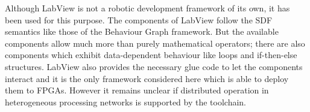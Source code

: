 \documentclass[a4paper,twocolumn]{esapub2005} %
\begin{document}
Although LabView is not a robotic development framework of its own, it has been used for this purpose.
The components of LabView follow the SDF semantics like those of the Behaviour Graph framework.
But the available components allow much more than purely mathematical operators; there are also components which exhibit data-dependent behaviour like loops and if-then-else structures.
LabView also provides the necessary glue code to let the components interact and it is the only framework considered here which is able to deploy them to FPGAs.
However it remains unclear if distributed operation in heterogeneous processing networks is supported by the toolchain.

\end{document}
